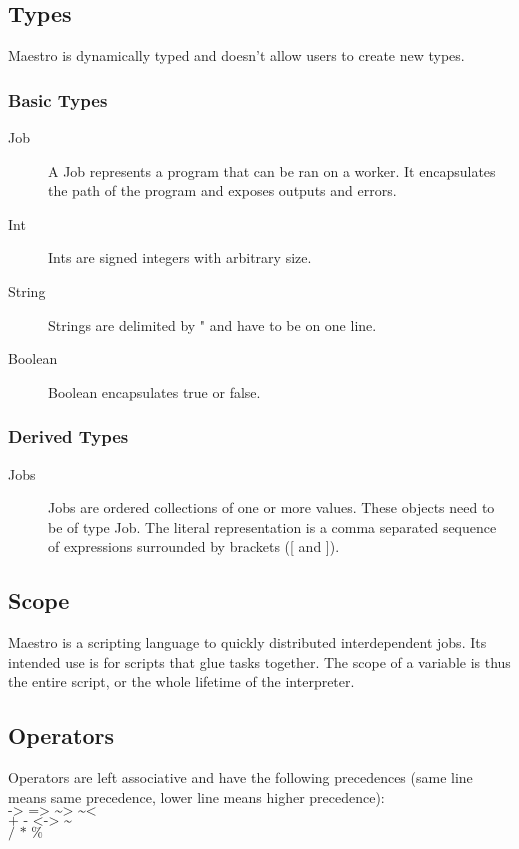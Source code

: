 \documentclass[12pt]{article}
\begin{document}
\subsection{Types}
Maestro is dynamically typed and doesn't allow users to create new types.
\subsubsection{Basic Types}
\begin{description}
  \item[Job] A Job represents a program that can be ran on a worker. It encapsulates
    the path of the program and exposes outputs and errors.
  \item[Int] Ints are signed integers with arbitrary size.
  \item[String] Strings are delimited by " and have to be on one line.
  \item[Boolean] Boolean encapsulates true or false.
\end{description}

\subsubsection{Derived Types}
\begin{description}
  \item[Jobs] Jobs are ordered collections of one or more values. These
    objects need to be of type Job. The literal representation is a
    comma separated sequence of expressions surrounded by brackets ([ and ]).
\end{description}

\subsection{Scope}
Maestro is a scripting language to quickly distributed interdependent jobs. Its
intended use is for scripts that glue tasks together. The scope of a variable
is thus the entire script, or the whole lifetime of the interpreter.

\subsection{Operators}
Operators are left associative and have the following precedences (same line
means same precedence, lower line means higher precedence):\\
$\texttt{-> => \textasciitilde> \textasciitilde<}$\\
$\texttt{+ - <-> \textasciitilde}$\\
$\texttt{/ * \%}$
\end{document}
